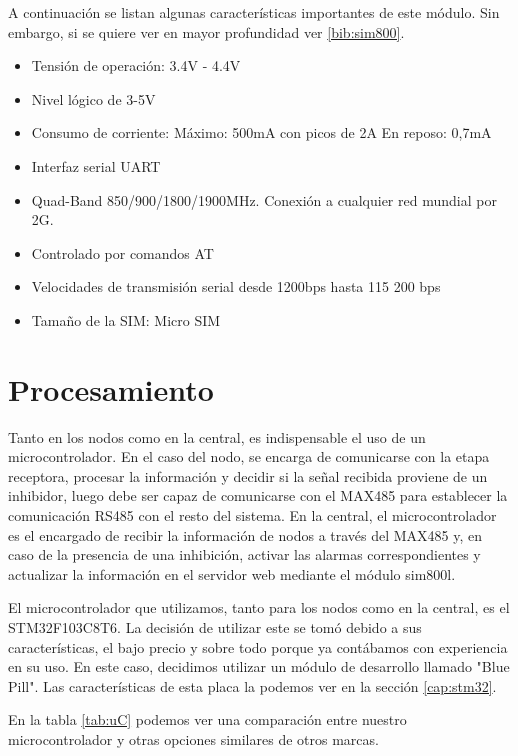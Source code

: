 A continuación se listan algunas características importantes de este módulo. Sin embargo, si se quiere ver en mayor profundidad ver \ref{bib:sim800}.

\begin{itemize}
    \item Tensión de operación: 3.4V - 4.4V
    \item Nivel lógico de 3-5V
    \item Consumo de corriente:
    \subitem Máximo: 500mA con picos de 2A
    \subitem En reposo: 0,7mA
    \item Interfaz serial UART
    \item Quad-Band 850/900/1800/1900MHz. Conexión a cualquier red mundial por 2G.
    \item Controlado por comandos AT
    \item Velocidades de transmisión serial desde 1200bps hasta 115 200 bps
    \item Tamaño de la SIM: Micro SIM
\end{itemize}

\section{Procesamiento} \par

Tanto en los nodos como en la central, es indispensable el uso de un microcontrolador. En el caso del nodo, se encarga de comunicarse con la etapa receptora,
procesar la información y decidir si la señal recibida proviene de un inhibidor, luego debe ser capaz de comunicarse con el MAX485 para establecer la comunicación
RS485 con el resto del sistema. En la central, el microcontrolador es el encargado de recibir la información de nodos a través del MAX485 y,
en caso de la presencia de una inhibición, activar las alarmas correspondientes y actualizar la información en el servidor web mediante el módulo sim800l. \par

El microcontrolador que utilizamos, tanto para los nodos como en la central, es el STM32F103C8T6. La decisión de utilizar este se tomó debido 
a sus características, el bajo precio y sobre todo porque ya contábamos con experiencia en su uso.
En este caso, decidimos utilizar un módulo de desarrollo llamado "Blue Pill". Las características de esta placa la podemos ver en la sección \ref{cap:stm32}.

En la tabla \ref{tab:uC} podemos ver una comparación entre nuestro microcontrolador y otras opciones similares de otros marcas.

